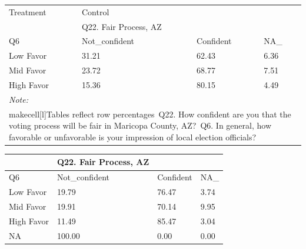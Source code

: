 \documentclass[
  11pt,
  a4paper,
]{article}
\begin{document}
\begin{table}
\centering
\centering
\begin{tabular}[t]{l|l|l|l}
\hline
\multicolumn{1}{l|}{Treatment} & \multicolumn{1}{l}{Control} \\
\cline{1-1} \cline{2-2}
 & Q22. Fair Process, AZ &  & \\
\hline
Q6 & Not\_confident & Confident & NA\_\\
\hline
Low Favor & 31.21 & 62.43 & 6.36\\
\hline
Mid Favor & 23.72 & 68.77 & 7.51\\
\hline
High Favor & 15.36 & 80.15 & 4.49\\
\hline
\multicolumn{4}{l}{\rule{0pt}{1em}\textit{Note: }}\\
\multicolumn{4}{l}{\rule{0pt}{1em}makecell[l]{Tables reflect row percentages\ Q22. How confident are you that the voting process will be fair in Maricopa County, AZ?\ Q6. In general, how favorable or unfavorable is your impression of local election officials?}}\\
\end{tabular}
\centering
\begin{tabular}[t]{l|l|l|l}
\hline
 & Q22. Fair Process, AZ &  & \\
\hline
Q6 & Not\_confident & Confident & NA\_\\
\hline
Low Favor & 19.79 & 76.47 & 3.74\\
\hline
Mid Favor & 19.91 & 70.14 & 9.95\\
\hline
High Favor & 11.49 & 85.47 & 3.04\\
\hline
NA & 100.00 & 0.00 & 0.00\\
\hline
\end{tabular}
\end{table}
\end{document}
